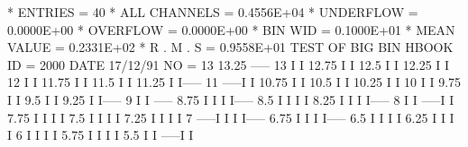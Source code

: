 \begin{Listing}
 * ENTRIES =         40      * ALL CHANNELS = 0.4556E+04      * UNDERFLOW = 0.0000E+00      * OVERFLOW = 0.0000E+00
 * BIN WID = 0.1000E+01      * MEAN VALUE   = 0.2331E+02      * R . M . S = 0.9558E+01
 TEST OF BIG BIN                                                                 
 HBOOK     ID =      2000                                        DATE  17/12/91              NO =  13
       13.25                             -----
       13                                I   I
       12.75                             I   I
       12.5                              I   I
       12.25                             I   I
       12                                I   I
       11.75                             I   I
       11.5                              I   I
       11.25                             I   I-----
       11                           -----I        I
       10.75                        I             I
       10.5                         I             I
       10.25                        I             I
       10                           I             I
        9.75                        I             I
        9.5                         I             I
        9.25                        I             I-----
        9                           I                  I                    -----
        8.75                        I                  I                    I   I-----
        8.5                         I                  I                    I        I
        8.25                        I                  I                    I        I-----
        8                           I                  I               -----I             I
        7.75                        I                  I               I                  I
        7.5                         I                  I               I                  I
        7.25                        I                  I               I                  I
        7                      -----I                  I               I                  I-----
        6.75                   I                       I               I                       I-----
        6.5                    I                       I               I                            I
        6.25                   I                       I               I                            I
        6                      I                       I               I                            I
        5.75                   I                       I               I                            I
        5.5                    I                       I          -----I                            I

\end{Listing}
